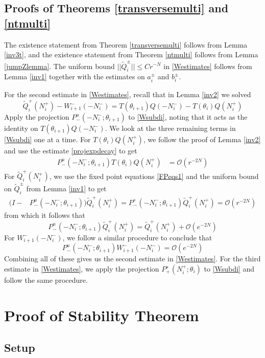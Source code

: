 \documentclass[12pt]{article}
\begin{document}
\subsection{Proofs of Theorems \ref{transversemulti} and \ref{ntmulti}}
The existence statement from Theorem \ref{transversemulti} follows from Lemma \ref{inv3t}, and the existence statement from Theorem \ref{ntmulti} follows from Lemma \ref{jumpZlemma}. The uniform bound $||\tilde{Q}_i^\pm|| \leq C r^{-N}$ in \eqref{Westimates} follows from Lemma \ref{inv1} together with the estimates on $a_i^\pm$ and $b_i^\pm$. 

For the second estimate in \eqref{Westimates}, recall that in Lemma \ref{inv2} we solved
\begin{equation}\label{Wsubdi}
\tilde{Q}_i^+(N_i^+) - W_{i+1}^-(-N_i^-) = T(\theta_{i+1}) Q(-N_i^-) - T(\theta_i) Q(N_i^+)
\end{equation}
Apply the projection $P^u_-(-N_i^-; \theta_{i+1})$ to \eqref{Wsubdi}, noting that it acts as the identity on $T(\theta_{i+1}) Q(-N_i^-)$. We look at the three remaining terms in \eqref{Wsubdi} one at a time. For $T(\theta_i) Q(N_i^+)$, we follow the proof of Lemma \ref{inv2} and use the estimate \ref{projexpdecay} to get
\begin{align*}
P^u_-(-N_i^-; \theta_{i+1})T(\theta_i) Q(N_i^+)
&= \mathcal{O}(r^{-2N})
\end{align*}
For $\tilde{Q}_i^+(N_i^+)$, we use the fixed point equations \eqref{FPeqs1} and the uniform bound on $\tilde{Q}_i^\pm$ from Lemma \ref{inv1} to get
\begin{align*}
(I - &P^u_-(-N_i^-; \theta_{i+1})) \tilde{Q}_i^+(N_i^+) = P^s_-(-N_i^-; \theta_{i+1}) \tilde{Q}_i^+(N_i^+) = \mathcal{O}(r^{-2N})
\end{align*}
from which it follows that
\[
P^u_-(-N_i^-; \theta_{i+1}) \tilde{Q}_i^+(N_i^+) = \tilde{Q}_i^+(N_i^+) + \mathcal{O}(e^{-2N})
\]
For $W_{i+1}^-(-N_i^-)$, we follow a similar procedure to conclude that
\[
P^u_-(-N_i^-; \theta_{i+1}) W_{i+1}^-(-N_i^-) = \mathcal{O}(e^{-2N})
\]
Combining all of these gives us the second estimate in \eqref{Westimates}. For the third estimate in \eqref{Westimates}, we apply the projection $P^s_+(N_i^+; \theta_i)$ to \eqref{Wsubdi} and follow the same procedure.

\section{Proof of Stability Theorem}

\subsection{Setup}
\end{document}

